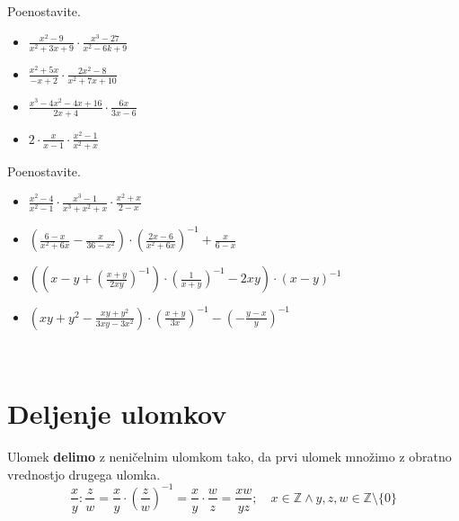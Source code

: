         
            \begin{naloga}
                Poenostavite.
                \begin{itemize}
                    \item $\frac{x^2-9}{x^2+3x+9}\cdot\frac{x^3-27}{x^2-6k+9}$ 
                    \item $\frac{x^2+5x}{-x+2}\cdot\frac{2x^2-8}{x^2+7x+10}$ 
                    \item $\frac{x^3-4x^2-4x+16}{2x+4}\cdot\frac{6x}{3x-6}$ 
                    \item $2\cdot\frac{x}{x-1}\cdot\frac{x^2-1}{x^2+x}$ 
                \end{itemize}
            \end{naloga}
        


        
            \begin{naloga}
                Poenostavite.
                \begin{itemize}
                    \item $\frac{x^2-4}{x^2-1}\cdot\frac{x^3-1}{x^3+x^2+x}\cdot\frac{x^2+x}{2-x}$ 
                    \item $\left(\frac{6-x}{x^2+6x}-\frac{x}{36-x^2}\right)\cdot\left(\frac{2x-6}{x^2+6x}\right)^{-1}+\frac{x}{6-x}$ 
                    \item $\left(\left(x-y+\left(\frac{x+y}{2xy}\right)^{-1}\right)\cdot\left(\frac{1}{x+y}\right)^{-1}-2xy\right)\cdot(x-y)^{-1}$ 
                    \item $\left(xy+y^2-\frac{xy+y^2}{3xy-3x^2}\right)\cdot\left(\frac{x+y}{3x}\right)^{-1}-\left(-\frac{y-x}{y}\right)^{-1}$ 
                \end{itemize}
            \end{naloga}
        


            ~

        \section{Deljenje ulomkov}

        
                Ulomek \textbf{delimo} z neničelnim ulomkom tako, da prvi ulomek množimo z obratno vrednostjo drugega ulomka.
                $$\dfrac{x}{y}:\dfrac{z}{w}=\dfrac{x}{y}\cdot\left(\dfrac{z}{w}\right)^{-1}=\dfrac{x}{y}\cdot\dfrac{w}{z}=\dfrac{xw}{yz}; \quad x\in\mathbb{Z}\land y,z,w\in\mathbb{Z}\setminus\{0\} $$
            


